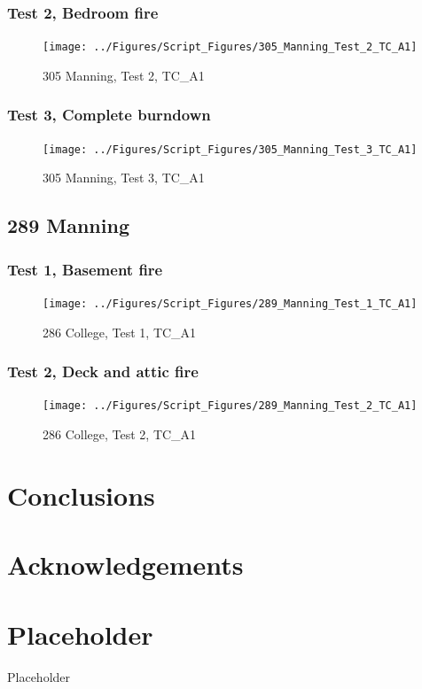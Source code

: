 \documentclass[12pt,oneside]{book}
\begin{document}
\subsection{Test 2, Bedroom fire}

\begin{figure}[!ht]
\texttt{[image: ../Figures/Script\_Figures/305\_Manning\_Test\_2\_TC\_A1]}
\caption{305 Manning, Test 2, TC\_A1}
\label{fig:305_Manning_Test_2_TC_A1}
\end{figure}

\subsection{Test 3, Complete burndown}

\begin{figure}[!ht]
\texttt{[image: ../Figures/Script\_Figures/305\_Manning\_Test\_3\_TC\_A1]}
\caption{305 Manning, Test 3, TC\_A1}
\label{fig:305_Manning_Test_3_TC_A1}
\end{figure}

\clearpage


\section{289 Manning}

\subsection{Test 1, Basement fire}

\begin{figure}[!ht]
\texttt{[image: ../Figures/Script\_Figures/289\_Manning\_Test\_1\_TC\_A1]}
\caption{286 College, Test 1, TC\_A1}
\label{fig:289_Manning_Test_1_TC_A1}
\end{figure}

\subsection{Test 2, Deck and attic fire}

\begin{figure}[!ht]
\texttt{[image: ../Figures/Script\_Figures/289\_Manning\_Test\_2\_TC\_A1]}
\caption{286 College, Test 2, TC\_A1}
\label{fig:289_Manning_Test_2_TC_A1}
\end{figure}


\clearpage


\chapter{Conclusions}
\label{chap:Conclusions}

\chapter{Acknowledgements}
\label{chap:Acknowledgements}



\appendix

\chapter{Placeholder}

Placeholder
\end{document}
